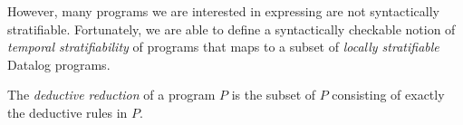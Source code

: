 However, many programs we are interested in expressing are not syntactically
stratifiable.  Fortunately, we are able to define a syntactically checkable
notion of {\em temporal stratifiability} of \slang programs that maps to a
subset of {\em locally stratifiable}  Datalog programs.



%
%

%

%
%

%
%


\begin{definition} 
%
The \emph{deductive reduction} of a \slang program $P$ is
the subset of $P$ consisting of exactly the deductive rules in $P$.
%
\end{definition}

